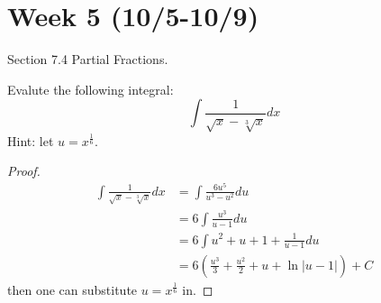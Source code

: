 \documentclass[openany]{book}
\begin{document}
\newpage
\section*{\centering Week 5 (10/5-10/9)}
Section 7.4 Partial Fractions.


\begin{prob}
    Evalute the following integral:
    \begin{equation*}
        \int\frac{1}{\sqrt{x}-\sqrt[3]{x}}dx
    \end{equation*}
    Hint: let $u=x^\frac{1}{6}$.
\end{prob}
\begin{proof}
    \begin{align*}
        \int\frac{1}{\sqrt{x}-\sqrt[3]{x}}dx&=\int \frac{6u^5}{u^3-u^2}du\\
        &=6\int\frac{u^3}{u-1}du\\
        &=6\int u^2+u+1+\frac{1}{u-1}du\\
        &=6\left(\frac{u^3}{3}+\frac{u^2}{2}+u+\ln|u-1|\right)+C
    \end{align*}
    then one can substitute $u=x^\frac{1}{6}$ in.
\end{proof}





\end{document}
